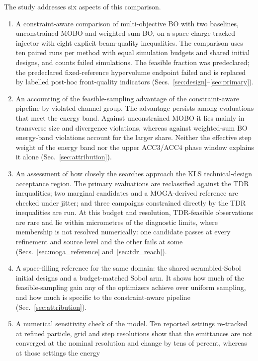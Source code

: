 \documentclass[aps,prab,reprint,superscriptaddress,amsmath,amssymb,floatfix]{revtex4-2}
\begin{document}
The study addresses six aspects of this comparison.
\begin{enumerate}
\item A constraint-aware comparison of multi-objective BO with two baselines, unconstrained
  MOBO and weighted-sum BO, on a space-charge-tracked injector with eight explicit
  beam-quality inequalities. The comparison uses ten paired runs per method with equal
  simulation budgets and shared initial designs, and counts failed simulations. The
  feasible fraction was predeclared; the predeclared fixed-reference hypervolume endpoint
  failed and is replaced by labelled post-hoc front-quality indicators
  (Secs.~\ref{sec:design}--\ref{sec:primary}).
\item An accounting of the feasible-sampling advantage of the constraint-aware pipeline
  by violated channel group. The advantage persists among evaluations that meet the energy
  band. Against unconstrained MOBO it lies mainly in transverse size and divergence
  violations, whereas against weighted-sum BO energy-band violations account for the larger
  share. Neither the effective step weight of the energy band nor the upper ACC3/ACC4 phase
  window explains it alone (Sec.~\ref{sec:attribution}).
\item An assessment of how closely the searches approach the KLS technical-design acceptance region.
The primary
  evaluations are reclassified against the TDR inequalities; two marginal candidates and a
  MOGA-derived reference are checked under jitter; and three campaigns constrained directly
  by the TDR inequalities are run. At this budget and resolution, TDR-feasible observations
  are rare and lie within micrometres of the diagnostic limits, where membership is not
  resolved numerically: one candidate passes at every refinement and source level and the
  other fails at some (Secs.~\ref{sec:moga_reference} and~\ref{sec:tdr_reach}).
\item A space-filling reference for the same domain: the shared scrambled-Sobol initial
  designs and a budget-matched Sobol arm. It shows how much of the feasible-sampling gain
  any of the optimizers achieve over uniform sampling, and how much is specific to the
  constraint-aware pipeline (Sec.~\ref{sec:attribution}).
\item A numerical sensitivity check of the model. Ten reported settings re-tracked at
  refined particle, grid and step resolutions show that the emittances are not converged at
  the nominal resolution and change by tens of percent, whereas at those settings the energy

\end{enumerate}
\end{document}
